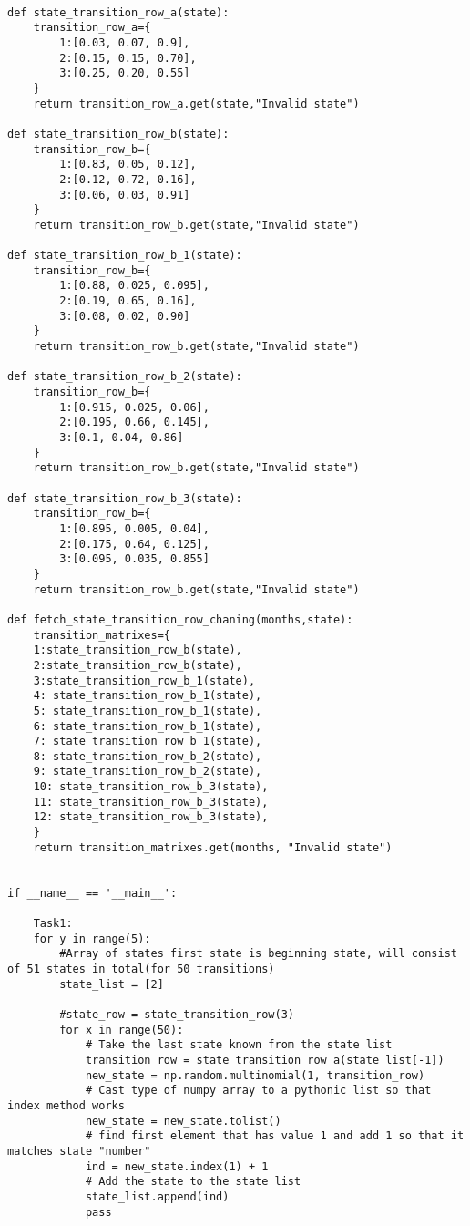 \documentclass[a4paper]{article}
\begin{document}
\begin{lstlisting}

def state_transition_row_a(state):
    transition_row_a={
        1:[0.03, 0.07, 0.9],
        2:[0.15, 0.15, 0.70],
        3:[0.25, 0.20, 0.55]
    }
    return transition_row_a.get(state,"Invalid state")

def state_transition_row_b(state):
    transition_row_b={
        1:[0.83, 0.05, 0.12],
        2:[0.12, 0.72, 0.16],
        3:[0.06, 0.03, 0.91]
    }
    return transition_row_b.get(state,"Invalid state")

def state_transition_row_b_1(state):
    transition_row_b={
        1:[0.88, 0.025, 0.095],
        2:[0.19, 0.65, 0.16],
        3:[0.08, 0.02, 0.90]
    }
    return transition_row_b.get(state,"Invalid state")

def state_transition_row_b_2(state):
    transition_row_b={
        1:[0.915, 0.025, 0.06],
        2:[0.195, 0.66, 0.145],
        3:[0.1, 0.04, 0.86]
    }
    return transition_row_b.get(state,"Invalid state")

def state_transition_row_b_3(state):
    transition_row_b={
        1:[0.895, 0.005, 0.04],
        2:[0.175, 0.64, 0.125],
        3:[0.095, 0.035, 0.855]
    }
    return transition_row_b.get(state,"Invalid state")

def fetch_state_transition_row_chaning(months,state):
    transition_matrixes={
    1:state_transition_row_b(state),
    2:state_transition_row_b(state),
    3:state_transition_row_b_1(state),
    4: state_transition_row_b_1(state),
    5: state_transition_row_b_1(state),
    6: state_transition_row_b_1(state),
    7: state_transition_row_b_1(state),
    8: state_transition_row_b_2(state),
    9: state_transition_row_b_2(state),
    10: state_transition_row_b_3(state),
    11: state_transition_row_b_3(state),
    12: state_transition_row_b_3(state),
    }
    return transition_matrixes.get(months, "Invalid state")


if __name__ == '__main__':

    Task1:
    for y in range(5):
        #Array of states first state is beginning state, will consist of 51 states in total(for 50 transitions)
        state_list = [2]

        #state_row = state_transition_row(3)
        for x in range(50):
            # Take the last state known from the state list
            transition_row = state_transition_row_a(state_list[-1])
            new_state = np.random.multinomial(1, transition_row)
            # Cast type of numpy array to a pythonic list so that index method works
            new_state = new_state.tolist()
            # find first element that has value 1 and add 1 so that it matches state "number"
            ind = new_state.index(1) + 1
            # Add the state to the state list
            state_list.append(ind)
            pass



\end{lstlisting}
\end{document}
